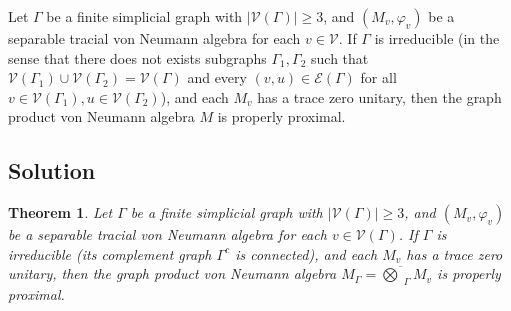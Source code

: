 \documentclass[12pt]{article}
\newtheorem{theorem}{Theorem}
\newcommand{\VV}{\mathcal{V}}
\newcommand{\EE}{\mathcal{E}}
\newcommand{\GG}{\Gamma}
\begin{document}
Let $\Gamma$ be a finite simplicial graph with $|\VV(\GG)|\geq 3$, and $(M_v,\varphi_v)$ be a separable tracial von Neumann algebra for each $v\in \VV$. If $\Gamma$ is irreducible (in the sense that there does not exists subgraphs $\GG_1,\GG_2$ such that $ \VV(\GG_1)\cup \VV(\GG_2)=\VV(\GG) $ and every $(v,u)\in \EE(\GG) $ for all $v\in\VV(\GG_1),u\in \VV(\GG_2)$), and each $M_v$ has a trace zero unitary, then the graph product von Neumann algebra $M$ is properly proximal.

\subsection*{Solution}

\begin{theorem}
Let $\Gamma$ be a finite simplicial graph with $|\VV(\Gamma)|\geq 3$, and $(M_v,\varphi_v)$ be a separable tracial von Neumann algebra for each $v\in \VV(\Gamma)$. If $\Gamma$ is irreducible (its complement graph $\Gamma^c$ is connected), and each $M_v$ has a trace zero unitary, then the graph product von Neumann algebra $M_\Gamma = \overline{\bigotimes}_\Gamma M_v$ is properly proximal.
\end{theorem}
\end{document}
